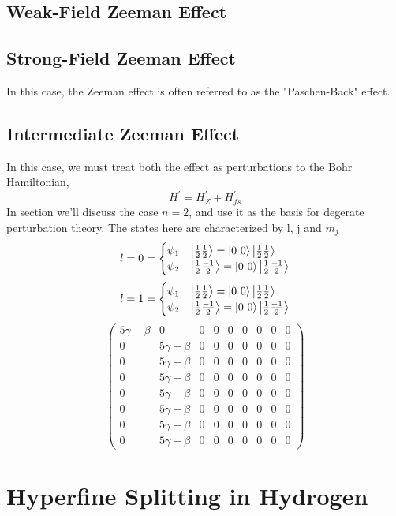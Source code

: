 \subsection{Weak-Field Zeeman Effect}
\subsection{Strong-Field Zeeman Effect}
In this case, the Zeeman effect is often referred to as the "Paschen-Back" effect. 
\subsection{Intermediate Zeeman Effect}
In this case, we must treat both the effect as perturbations to the Bohr Hamiltonian,
\begin{equation}
H^{'} = H^{'}_{Z} + H^{'}_{fs}
\end{equation}
In section we'll discuss the case $n = 2$, and use it as the basis for degerate perturbation theory. The states here are characterized by l, j and $m_{j}$
$$l = 0 = \begin{cases}
\psi_{1} & \ket{\frac{1}{2} \frac{1}{2}} = \ket{0 \ 0}\ket{\frac{1}{2}\frac{1}{2}}\\
\psi_{2} & \ket{\frac{1}{2} \frac{-1}{2}} = \ket{0 \ 0}\ket{\frac{1}{2}\frac{-1}{2}}
\end{cases} $$
$$l = 1 = \begin{cases}
\psi_{1} & \ket{\frac{1}{2} \frac{1}{2}} = \ket{0 \ 0}\ket{\frac{1}{2}\frac{1}{2}}\\
\psi_{2} & \ket{\frac{1}{2} \frac{-1}{2}} = \ket{0 \ 0}\ket{\frac{1}{2}\frac{-1}{2}}
\end{cases} $$
\begin{equation}
\begin{pmatrix}
5 \gamma - \beta & 0 & 0 & 0 & 0 & 0 & 0 & 0 & 0 \\
0 & 5 \gamma + \beta & 0 & 0 & 0 & 0 & 0 & 0 & 0\\
0 & 5 \gamma + \beta & 0 & 0 & 0 & 0 & 0 & 0 & 0\\
0 & 5 \gamma + \beta & 0 & 0 & 0 & 0 & 0 & 0 & 0\\
0 & 5 \gamma + \beta & 0 & 0 & 0 & 0 & 0 & 0 & 0\\
0 & 5 \gamma + \beta & 0 & 0 & 0 & 0 & 0 & 0 & 0\\
0 & 5 \gamma + \beta & 0 & 0 & 0 & 0 & 0 & 0 & 0\\
0 & 5 \gamma + \beta & 0 & 0 & 0 & 0 & 0 & 0 & 0
\end{pmatrix}
\end{equation}
\section{Hyperfine Splitting in Hydrogen}

